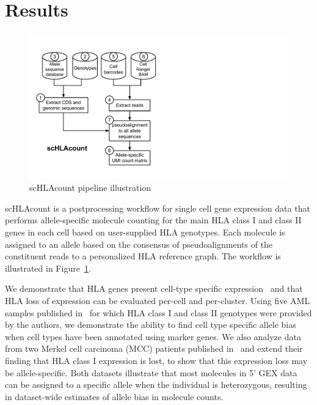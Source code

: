 \documentclass{article}[12pt]
\begin{document}
\newpage
\section*{Results}

\begin{figure}
\includegraphics[width=\hsize]{figures/workflow-updated.pdf}
\caption{scHLAcount pipeline illustration}
\label{fig:workflow}
\end{figure}

scHLAcount is a postprocessing workflow for single cell gene expression data that performs allele-specific molecule counting for the main HLA class I and class II genes in each cell based on user-supplied HLA genotypes. Each molecule is assigned to an allele based on the consensus of pseudoalignments of the constituent reads to a personalized HLA reference graph. The workflow is illustrated in Figure~\ref{fig:workflow}. 

We demonstrate that HLA genes present cell-type specific expression~\parencite{Boegel2018} and that HLA loss of expression can be evaluated per-cell and per-cluster. Using five AML samples published in~\parencite{Petti2019} for which HLA class I and class II genotypes were provided by the authors, we demonstrate the ability to find cell type specific allele bias when cell types have been annotated using marker genes. We also analyze data from two Merkel cell carcinoma (MCC) patients published in~\parencite{Yost2019} and extend their finding that HLA class I expression is lost, to show that this expression loss may be allele-specific. Both datasets illustrate that most molecules in 5' GEX data can be assigned to a specific allele when the individual is heterozygous, resulting in dataset-wide estimates of allele bias in molecule counts.
\end{document}
